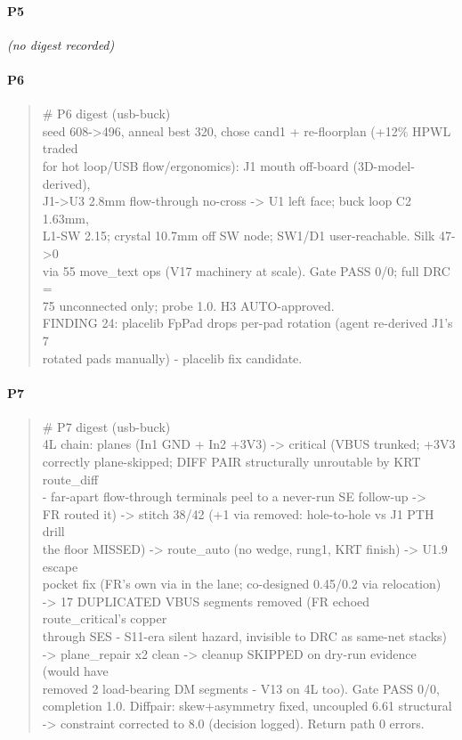 \documentclass[11pt,a4paper]{article}
\begin{document}
\paragraph*{P5}
\emph{(no digest recorded)}
\paragraph*{P6}
\begin{quote}\small\ttfamily\raggedright
\# P6 digest (usb-buck)\\
seed 608-\textgreater{}496, anneal best 320, chose cand1 + re-floorplan (+12\% HPWL traded\\
for hot loop/USB flow/ergonomics): J1 mouth off-board (3D-model-derived),\\
J1-\textgreater{}U3 2.8mm flow-through no-cross -\textgreater{} U1 left face; buck loop C2 1.63mm,\\
L1-SW 2.15; crystal 10.7mm off SW node; SW1/D1 user-reachable. Silk 47-\textgreater{}0\\
via 55 move\_text ops (V17 machinery at scale). Gate PASS 0/0; full DRC =\\
75 unconnected only; probe 1.0. H3 AUTO-approved.\\
FINDING 24: placelib FpPad drops per-pad rotation (agent re-derived J1's 7\\
rotated pads manually) - placelib fix candidate.
\end{quote}
\paragraph*{P7}
\begin{quote}\small\ttfamily\raggedright
\# P7 digest (usb-buck)\\
4L chain: planes (In1 GND + In2 +3V3) -\textgreater{} critical (VBUS trunked; +3V3\\
correctly plane-skipped; DIFF PAIR structurally unroutable by KRT route\_diff\\
- far-apart flow-through terminals peel to a never-run SE follow-up -\textgreater{}\\
FR routed it) -\textgreater{} stitch 38/42 (+1 via removed: hole-to-hole vs J1 PTH drill\\
the floor MISSED) -\textgreater{} route\_auto (no wedge, rung1, KRT finish) -\textgreater{} U1.9 escape\\
pocket fix (FR's own via in the lane; co-designed 0.45/0.2 via relocation)\\
-\textgreater{} 17 DUPLICATED VBUS segments removed (FR echoed route\_critical's copper\\
through SES - S11-era silent hazard, invisible to DRC as same-net stacks)\\
-\textgreater{} plane\_repair x2 clean -\textgreater{} cleanup SKIPPED on dry-run evidence (would have\\
removed 2 load-bearing DM segments - V13 on 4L too). Gate PASS 0/0,\\
completion 1.0. Diffpair: skew+asymmetry fixed, uncoupled 6.61 structural\\
-\textgreater{} constraint corrected to 8.0 (decision logged). Return path 0 errors.
\end{quote}
\end{document}
